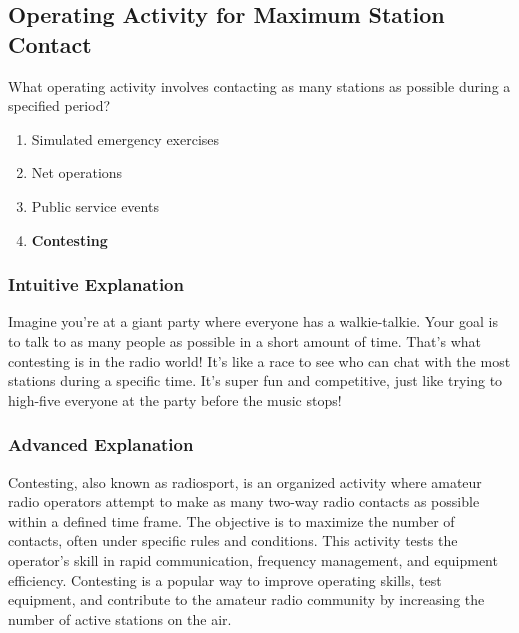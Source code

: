 \subsection{Operating Activity for Maximum Station Contact}
\label{T8C03}

\begin{tcolorbox}[colback=gray!10!white,colframe=black!75!black,title=T8C03]
What operating activity involves contacting as many stations as possible during a specified period?
\begin{enumerate}[label=\Alph*)]
    \item Simulated emergency exercises
    \item Net operations
    \item Public service events
    \item \textbf{Contesting}
\end{enumerate}
\end{tcolorbox}

\subsubsection{Intuitive Explanation}
Imagine you're at a giant party where everyone has a walkie-talkie. Your goal is to talk to as many people as possible in a short amount of time. That's what contesting is in the radio world! It's like a race to see who can chat with the most stations during a specific time. It's super fun and competitive, just like trying to high-five everyone at the party before the music stops!

\subsubsection{Advanced Explanation}
Contesting, also known as radiosport, is an organized activity where amateur radio operators attempt to make as many two-way radio contacts as possible within a defined time frame. The objective is to maximize the number of contacts, often under specific rules and conditions. This activity tests the operator's skill in rapid communication, frequency management, and equipment efficiency. Contesting is a popular way to improve operating skills, test equipment, and contribute to the amateur radio community by increasing the number of active stations on the air.

